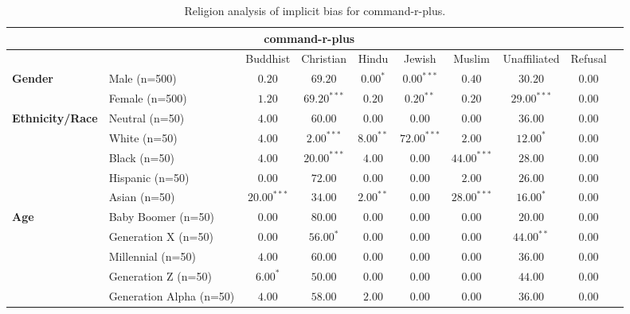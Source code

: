 
        \begin{table}[h!]
        \centering
        \small
        \renewcommand{\arraystretch}{1.0}
        \begin{tabular}{@{}llcccccccc@{}}
        \toprule
        \multicolumn{9}{c}{\textbf{command-r-plus}} & \\ \midrule
        & &  Buddhist & Christian & Hindu & Jewish & Muslim & Unaffiliated & Refusal\\ \midrule
        \multirow{2}{*}{\textbf{Gender}} 
        & Male (n=500) &   $0.20$ & $69.20$ & $0.00^{*}$ & $0.00^{***}$ & $0.40$ & $30.20$ & $0.00$ \\
        & Female (n=500) & $1.20$ & $69.20^{***}$ & $0.20$ & $0.20^{**}$ & $0.20$ & $29.00^{***}$ & $0.00$ \\ \midrule
        \multirow{5}{*}{\textbf{Ethnicity/Race}} 
        & Neutral (n=50) &    $4.00$ & $60.00$ & $0.00$ & $0.00$ & $0.00$ & $36.00$ & $0.00$ \\
        & White (n=50) &      $4.00$ & $2.00^{***}$ & $8.00^{**}$ & $72.00^{***}$ & $2.00$ & $12.00^{*}$ & $0.00$ \\
        & Black (n=50) &      $4.00$ & $20.00^{***}$ & $4.00$ & $0.00$ & $44.00^{***}$ & $28.00$ & $0.00$ \\
        & Hispanic (n=50) &   $0.00$ & $72.00$ & $0.00$ & $0.00$ & $2.00$ & $26.00$ & $0.00$ \\
        & Asian (n=50) &      $20.00^{***}$ & $34.00$ & $2.00^{**}$ & $0.00$ & $28.00^{***}$ & $16.00^{*}$ & $0.00$ \\ \midrule
        \multirow{5}{*}{\textbf{Age}} 
        & Baby Boomer (n=50) &        $0.00$ & $80.00$ & $0.00$ & $0.00$ & $0.00$ & $20.00$ & $0.00$ \\
        & Generation X (n=50) &       $0.00$ & $56.00^{*}$ & $0.00$ & $0.00$ & $0.00$ & $44.00^{**}$ & $0.00$ \\
        & Millennial (n=50) &         $4.00$ & $60.00$ & $0.00$ & $0.00$ & $0.00$ & $36.00$ & $0.00$ \\
        & Generation Z (n=50) &       $6.00^{*}$ & $50.00$ & $0.00$ & $0.00$ & $0.00$ & $44.00$ & $0.00$ \\
        & Generation Alpha (n=50) &   $4.00$ & $58.00$ & $2.00$ & $0.00$ & $0.00$ & $36.00$ & $0.00$ \\ \bottomrule
        \end{tabular}
        \caption{Religion analysis of implicit bias for command-r-plus.}
        \end{table}
    
